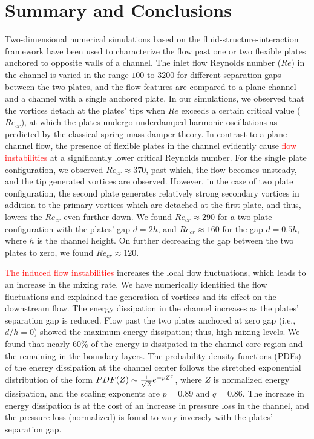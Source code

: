 \documentclass[aps,pre,twocolumn,aps,longbibliography]{revtex4-1}
\begin{document}
	\section{Summary and Conclusions}
	
	Two-dimensional numerical simulations based on the fluid-structure-interaction framework have been used to characterize the flow past one or two flexible plates anchored to opposite walls of a channel. The inlet flow Reynolds number ($Re$) in the channel is varied in the range $100$ to $3200$ for different separation gaps between the two plates, and the flow features are compared to a plane channel and a channel with a single anchored plate. In our simulations, we observed that the vortices detach at the plates' tips when $Re$ exceeds a certain critical value ($Re_{cr}$), at which the plates undergo underdamped harmonic oscillations as predicted by the classical spring-mass-damper theory. In contrast to a plane channel flow, the presence of flexible plates in the channel evidently cause \textcolor{red}{flow instabilities} at a significantly lower critical Reynolds number. For the single plate configuration, we observed $Re_{cr}\approx 370$, past which, the flow becomes unsteady, and the tip generated vortices are observed. However, in the case of two plate configuration, the second plate generates relatively strong secondary vortices in addition to the primary vortices which are detached at the first plate, and thus, lowers the $Re_{cr}$ even further down. We found $Re_{cr}\approx 290$ for a two-plate configuration with the plates' gap $d=2h$, and $Re_{cr}\approx 160$ for the gap $d=0.5h$, where $h$ is the channel height. On further decreasing the gap between the two plates to zero, we found $Re_{cr}\approx 120$.
	
	\textcolor{red}{The induced flow instabilities} increases the local flow fluctuations, which leads to an increase in the mixing rate. We have numerically identified the flow fluctuations and explained the generation of vortices and its effect on the downstream flow. The energy dissipation in the channel increases as the plates' separation gap is reduced. Flow past the two plates anchored at zero gap (i.e., $d/h=0$) showed the maximum energy dissipation; thus, high mixing levels. We found that nearly 60\% of the energy is dissipated in the channel core region and the remaining in the boundary layers. The probability density functions (PDFs) of the energy dissipation at the channel center follows the stretched exponential distribution of the form $PDF(Z)\sim{1\over{\sqrt{Z}}}e^{-pZ^{q}}$, where $Z$ is normalized energy dissipation, and the scaling exponents are $p=0.89$ and $q=0.86$. The increase in energy dissipation is at the cost of an increase in pressure loss in the channel, and the pressure loss (normalized) is found to vary inversely with the plates' separation gap. 
	
\end{document}
